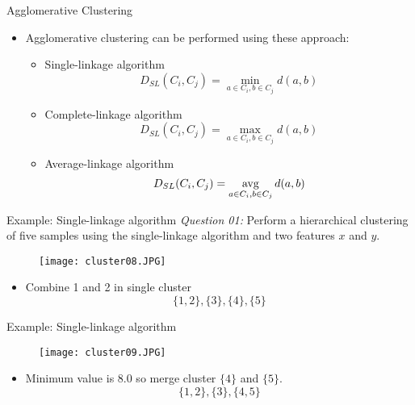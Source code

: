 \begin{frame}{Agglomerative Clustering}
\begin{itemize}
\item Agglomerative clustering can be performed using these approach:
\begin{itemize}
\item Single-linkage algorithm
\begin{equation}
D_{SL}(C_i,C_j)=\min_{a\in C_i,b\in C_j}{d(a,b)} \nonumber
\end{equation}
\item Complete-linkage algorithm
\begin{equation}
D_{SL}(C_i,C_j)=\max_{a\in C_i,b\in C_j}{d(a,b)} \nonumber
\end{equation}
\item Average-linkage algorithm
\begin{equation}
D_{SL}(C_i,C_j)=\mathop {\rm avg}\limits_{a\in C_i,b\in C_j}{d(a,b)} \nonumber
\end{equation}
\end{itemize}
\end{itemize}
\end{frame}



\begin{frame}{Example: Single-linkage algorithm}
\textit{\color{slidecolor}Question 01:} Perform a hierarchical clustering of five samples using the single-linkage algorithm and two features $x$ and $y$.
\begin{figure}
\texttt{[image: cluster08.JPG]}
\end{figure}
\begin{itemize}
\item Combine 1 and 2 in single cluster
\begin{equation}
\{1,2\},\{3\},\{4\},\{5\}\nonumber
\end{equation}
\end{itemize}
\end{frame}

\begin{frame}{Example: Single-linkage algorithm}
\begin{figure}
\texttt{[image: cluster09.JPG]}
\end{figure}
\begin{itemize}
\item Minimum value is 8.0 so merge cluster $\{4\}$ and $\{5\}$.
\begin{equation}
\{1,2\},\{3\},\{4,5\}\nonumber
\end{equation}
\end{itemize}
\end{frame}

